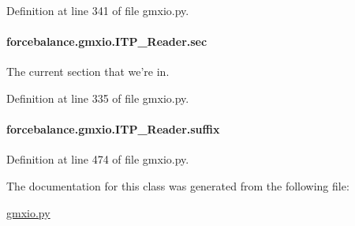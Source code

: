 Definition at line 341 of file gmxio.\-py.

\hypertarget{classforcebalance_1_1gmxio_1_1ITP__Reader_a744b1698c9ccfc1be470d83862099551}{
\paragraph[{sec}]{\setlength{\rightskip}{0pt plus 5cm}forcebalance.\-gmxio.\-I\-T\-P\-\_\-\-Reader.\-sec}}\label{classforcebalance_1_1gmxio_1_1ITP__Reader_a744b1698c9ccfc1be470d83862099551}


The current section that we're in. 



Definition at line 335 of file gmxio.\-py.

\hypertarget{classforcebalance_1_1gmxio_1_1ITP__Reader_a147438dd2683af88b92b659c96162848}{
\paragraph[{suffix}]{\setlength{\rightskip}{0pt plus 5cm}forcebalance.\-gmxio.\-I\-T\-P\-\_\-\-Reader.\-suffix}}\label{classforcebalance_1_1gmxio_1_1ITP__Reader_a147438dd2683af88b92b659c96162848}


Definition at line 474 of file gmxio.\-py.



The documentation for this class was generated from the following file\-:\begin{DoxyCompactItemize}
\item 
\hyperlink{gmxio_8py}{gmxio.\-py}\end{DoxyCompactItemize}
